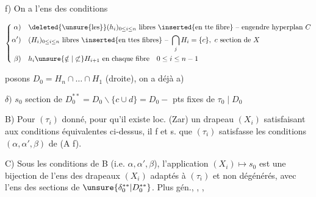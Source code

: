  f) On a l'ens des  conditions

\[
\left\{\begin{aligned}
\alpha)&\quad \deleted{\unsure{\text{les}}}(h_i)_{0\leq i\leq n}\ \text{libres \inserted{en tte fibre} -- engendre hyperplan }C\\
\alpha')&\quad(H_i)_{0\leq i\leq n}\ \text{libres \inserted{en ttes fibres} -- }\bigcap_j H_i=\{c\},\ c\ \text{section de }X\\
\beta)&\quad h_i\unsure{\notin|\not\subset}H_{i+1}\ \text{en chaque fibre}\quad 0\leq i\leq n-1
\end{aligned}\right.
\]


\deleted{\unsure{$\gamma)$}} posons  $D_0=H_n\cap\ldots\cap H_1$ (droite), on a déjà a)   

$\delta)$ $s_0$ section de  $D_0^{**}=D_0\smallsetminus\{c\cup d\}=D_0-$ pts fixes de $\tau_0\mid D_0$

B) Pour $(\tau_i)$ donné, pour qu'il existe loc. (Zar) un drapeau $(X_i)$ satisfaisant aux conditions équivalentes ci-dessus, il f et s. que $(\tau_i)$ satisfasse les conditions $(\alpha,\alpha',\beta)$ de (A f).

C) Sous les conditions de B (i.e. $\alpha,\alpha',\beta$), l'application $(X_i)\longmapsto s_0$ est une bijection de l'ens  des drapeaux $(X_i)$ adaptés à $(\tau_i)$ et non dégénérés, avec l'ens des sections de $\unsure{\delta_0^{**}|D_0^{**}}$. Plus gén., , ,


